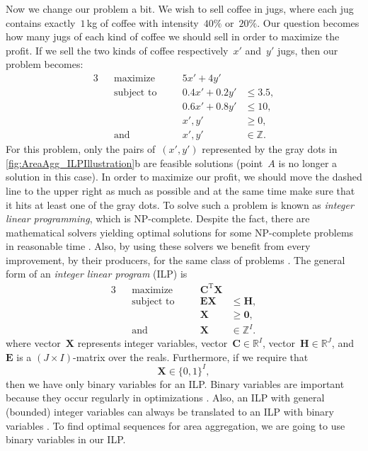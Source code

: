 Now we change our problem a bit.
We wish to sell coffee in jugs,
where each jug contains exactly~$1\,$kg of coffee 
with intensity~$40\%$ or~$20\%$.
Our question becomes how many jugs of each kind of coffee
we should sell in order to maximize the profit.
If we sell the two kinds of coffee 
respectively~$x'$ and~$y'$ jugs,
then our problem becomes:
\begin{alignat*}{3}
&&\text{maximize} 	\quad	&& 5x'+4y' 		&			\\
&&\text{subject to} \quad	&& 0.4x'+0.2y'	&\le 3.5, 	\\
&&					\quad	&& 0.6x'+0.8y' 	&\le 10, 	\\
&&					\quad	&& x', y' 		&\ge 0, 	\\
&&\text{and} 		\quad	&& x', y'		&\in \mathbb{Z}.
\end{alignat*}
For this problem, only the pairs of~$(x',y')$ 
represented by the gray dots in \fig\ref{fig:AreaAgg_ILPIllustration}b 
are feasible solutions
(point~$A$ is no longer a solution in this case).
In order to maximize our profit,
we should move the dashed line to the upper right 
as much as possible
and at the same time make sure that 
it hits at least one of the gray dots.
To solve such a problem is known as
\emph{integer linear programming},
which is NP-complete.
Despite the fact, there are
mathematical solvers yielding optimal solutions
for some NP-complete problems in reasonable time
\parencite{Haunert2017Label}.
Also, by using these solvers we benefit 
from every improvement, by their producers,
for the same class of problems
\parencite{Haunert2017Label}.
The general form of an \emph{integer linear program} (ILP) is
\begin{alignat*}{3}
&&\text{maximize} 	\quad&& \bm{C}^\mathrm{T}\bm{X}	&		\\
&&\text{subject to} \quad&& \bm{EX}			&\le \bm{H}, 	\\
&&					\quad&& \bm{X} 			&\ge \bm{0}, 	\\
&&\text{and}		\quad&& \bm{X} 			&\in \mathbb{Z}^I.
\end{alignat*}
where vector~$\bm{X}$ represents integer variables, 
vector~$\bm{C} \in \mathbb{R}^I$, 
vector~$\bm{H} \in \mathbb{R}^J$,
and~$\bm{E}$ is a $(J \times I)$-matrix over the reals.
Furthermore, if we require that
$$
\bm{X} 	\in \{0,1\}^I,
$$
then we have only binary variables for an ILP.
Binary variables are important 
because they occur regularly in optimizations
\parencite[]{bradley1977applied}.
Also, an ILP with general (bounded) integer variables 
can always be translated to an ILP with binary variables
\parencite[]{Williams2009Integer}.
To find optimal sequences for area aggregation, 
we are going to use binary variables in our ILP.

